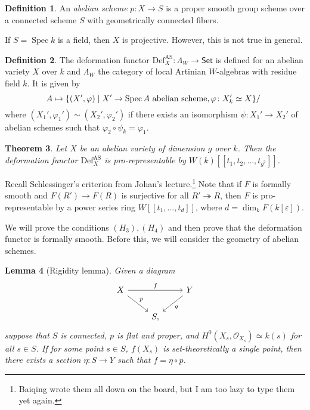 \documentclass[leqno, openany]{memoir}
\newtheorem{thm}{Theorem}[section]
\newtheorem{lem}[thm]{Lemma}
\theoremstyle{definition}
\newtheorem{defn}[thm]{Definition}
\theoremstyle{remark}
\theoremstyle{plain}
\theoremstyle{definition}
\theoremstyle{remark}
\newcommand{\ep}{\varepsilon}
\newcommand{\mc}[1]{\mathcal{#1}}
\newcommand{\mr}[1]{\mathrm{#1}}
\newcommand{\ms}[1]{\mathsf{#1}}
\DeclareMathOperator{\Spec}{Spec}
\begin{document}
\begin{defn}
    An \textit{abelian scheme} $p \colon X \to S$ is a proper smooth group scheme over a connected scheme $S$ with geometrically connected fibers.
\end{defn}

If $S = \Spec k$ is a field, then $X$ is projective. However, this is not true in general.

\begin{defn}
    The deformation functor $\mr{Def}_X^{\mr{AS}} \colon \Lambda_W \to \ms{Set}$ is defined for an abelian variety $X$ over $k$ and $\Lambda_W$ the category of local Artinian $W$-algebras with residue field $k$. It is given by
    \[ A \mapsto \qty{(X', \varphi) \mid X' \to \Spec A \text{ abelian scheme}, \varphi \colon X'_k \simeq X} / ~ \]
    where $(X_1', \varphi_1') \sim (X_2', \varphi_2')$ if there exists an isomorphism $\psi \colon X_1' \to X_2'$ of abelian schemes such that $\varphi_2 \circ \psi_k = \varphi_1$.
\end{defn}

\begin{thm}
    Let $X$ be an abelian variety of dimension $g$ over $k$. Then the deformation functor $\mr{Def}_X^{\mr{AS}}$ is pro-representable by $W(k)[[t_1, t_2, \ldots, t_{g^2}]]$.
\end{thm}

Recall Schlessinger's criterion from Johan's lecture.\footnote{Baiqing wrote them all down on the board, but I am too lazy to type them yet again.} Note that if $F$ is formally smooth and $F(R') \to F(R)$ is surjective for all $R' \twoheadrightarrow R$, then $F$ is pro-representable by a power series ring $W[[t_1, \ldots, t_d]]$, where $d = \dim_k F(k[\ep])$.

We will prove the conditions $(H_3), (H_4)$ and then prove that the deformation functor is formally smooth. Before this, we will consider the geometry of abelian schemes.

\begin{lem}[Rigidity lemma]
    Given a diagram
    \begin{equation*}
    \begin{tikzcd}
        X \ar{rr}{f} \ar{dr}{p} & & Y \ar{dl}{q} \\
        & S,
    \end{tikzcd}
    \end{equation*}
    suppose that $S$ is connected, $p$ is flat and proper, and $H^0(X_s, \mc{O}_{X_s}) \simeq k(s)$ for all $s \in S$. If for some point $s \in S$, $f(X_s)$ is set-theoretically a single point, then there exists a section $\eta \colon S \to Y$ such that $f = \eta \circ p$.
\end{lem}
\end{document}
